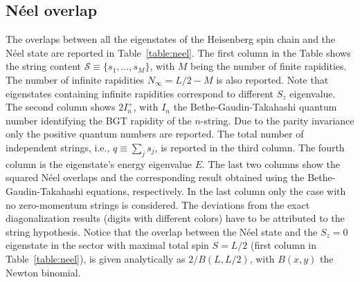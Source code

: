\documentclass[11pt]{iopart}
\begin{document}
\subsection{N\'eel overlap}
\label{app-neel}

The overlaps between all the eigenstates of the Heisenberg spin chain and the N\'eel 
state are reported in Table~\ref{table:neel}. The first column in the Table shows 
the string content ${\mathcal S}\equiv\{s_1,\dots,s_M\}$, with $M$ being the number 
of finite rapidities. The number of infinite rapidities $N_{\infty}=L/2-M$ is also 
reported. Note that eigenstates containing infinite rapidities correspond to 
different $S_z$ eigenvalue. The second column shows 
$2I_n^+$, with $I_n$ the Bethe-Gaudin-Takahashi quantum number identifying the 
BGT rapidity of the $n$-string. Due to the parity invariance only the positive 
quantum numbers are reported. The total number of independent strings, i.e., 
$q\equiv\sum_js_j$, is reported in the third column. The fourth column is the 
eigenstate's energy eigenvalue $E$. The last two columns show the squared N\'eel 
overlaps and the corresponding result obtained using the Bethe-Gaudin-Takahashi 
equations, respectively. In the last column only the case with no zero-momentum 
strings is considered. The deviations from the exact diagonalization results (digits 
with different colors) have to be attributed to the string hypothesis. Notice that  
the overlap between the N\'eel state and the $S_z=0$ eigenstate in the sector with 
maximal total spin $S=L/2$ (first column in Table~\ref{table:neel}), is given 
analytically as $2/B(L,L/2)$, with $B(x,y)$ the Newton binomial. 
\end{document}
